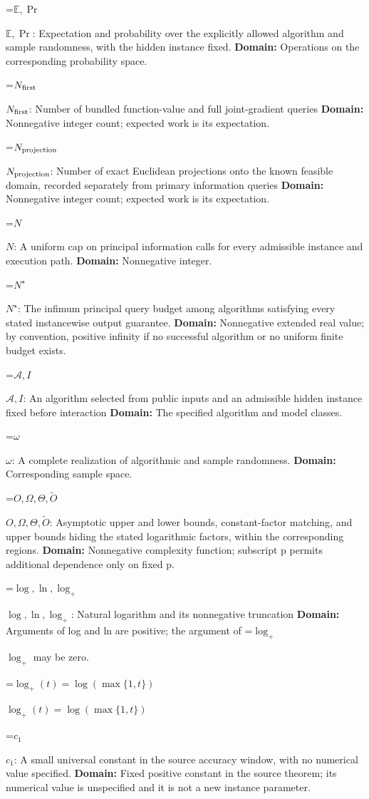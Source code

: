 \documentclass[10pt,a4paper]{article}
\newcommand{\AtlasMath}[1]{\par\begingroup\centering\setbox0=\hbox{$\displaystyle #1$}\ifdim\wd0>1.4\linewidth\typeout{ATLAS WIDE FORMULA: \the\wd0}\fi\ifdim\wd0>\linewidth\resizebox{\linewidth}{!}{\box0}\else\box0\fi\par\endgroup}
\newcommand{\AtlasInlineMath}[1]{\begingroup\setbox0=\hbox{$#1$}\ifdim\wd0>.4\linewidth\endgroup\AtlasMath{#1}\else\endgroup$#1$\fi}
\begin{document}
\AtlasInlineMath{\mathbb E,\Pr}: Expectation and probability over the explicitly allowed algorithm and sample randomness, with the hidden instance fixed. \textbf{Domain:} Operations on the corresponding probability space.

\AtlasInlineMath{N_{\rm first}}: Number of bundled function-value and full joint-gradient queries \textbf{Domain:} Nonnegative integer count; expected work is its expectation.

\AtlasInlineMath{N_{\rm projection}}: Number of exact Euclidean projections onto the known feasible domain, recorded separately from primary information queries \textbf{Domain:} Nonnegative integer count; expected work is its expectation.

\AtlasInlineMath{N}: A uniform cap on principal information calls for every admissible instance and execution path. \textbf{Domain:} Nonnegative integer.

\AtlasInlineMath{N^\star}: The infimum principal query budget among algorithms satisfying every stated instancewise output guarantee. \textbf{Domain:} Nonnegative extended real value; by convention, positive infinity if no successful algorithm or no uniform finite budget exists.

\AtlasInlineMath{\mathcal A,I}: An algorithm selected from public inputs and an admissible hidden instance fixed before interaction \textbf{Domain:} The specified algorithm and model classes.

\AtlasInlineMath{\omega}: A complete realization of algorithmic and sample randomness. \textbf{Domain:} Corresponding sample space.

\AtlasInlineMath{O,\Omega,\Theta,\widetilde O}: Asymptotic upper and lower bounds, constant-factor matching, and upper bounds hiding the stated logarithmic factors, within the corresponding regions. \textbf{Domain:} Nonnegative complexity function; subscript p permits additional dependence only on fixed p.

\AtlasInlineMath{\log,\ln,\log_+}: Natural logarithm and its nonnegative truncation \textbf{Domain:} Arguments of log and ln are positive; the argument of \AtlasInlineMath{\log_+} may be zero.

\AtlasInlineMath{\log_+(t)=\log(\max\{1,t\})}

\AtlasInlineMath{c_1}: A small universal constant in the source accuracy window, with no numerical value specified. \textbf{Domain:} Fixed positive constant in the source theorem; its numerical value is unspecified and it is not a new instance parameter.
\end{document}
